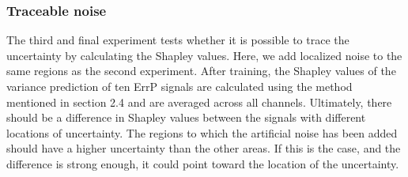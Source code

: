 \subsubsection{Traceable noise}

The third and final experiment tests whether it is possible to trace the uncertainty by calculating the Shapley values. Here, we add localized noise to the same regions as the second experiment. After training, the Shapley values of the variance prediction of ten ErrP signals are calculated using the method mentioned in section 2.4 and are averaged across all channels. Ultimately, there should be a difference in Shapley values between the signals with different locations of uncertainty. The regions to which the artificial noise has been added should have a higher uncertainty than the other areas. If this is the case, and the difference is strong enough, it could point toward the location of the uncertainty.